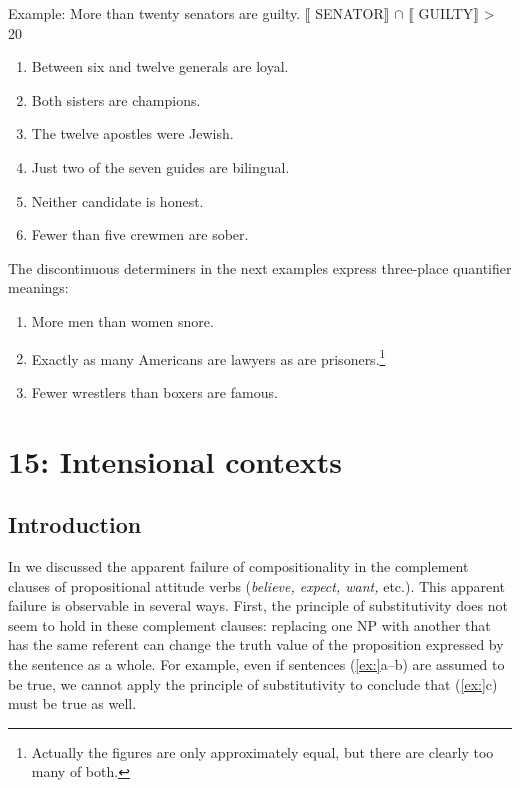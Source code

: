 \begin{stylepoints}
\textsf{Example:} \textsf{More than twenty}\textsf{ senators are guilty.   {\textbar}} $\llbracket$ \textsf{SENATOR}$\rrbracket$ \textsf{ ${\cap}$} $\llbracket$ \textsf{GUILTY}$\rrbracket$ \textsf{ {\textbar} > 20}
\end{stylepoints}

\begin{enumerate}
\item Between six and twelve generals are loyal.
\item Both sisters are champions.
\item The twelve apostles were Jewish.
\item Just two of the seven guides are bilingual.
\item Neither candidate is honest.
\item Fewer than five crewmen are sober.
\end{enumerate}

The discontinuous determiners in the next examples express three-place quantifier meanings:

\begin{enumerate}
\item More men than women snore.
\item Exactly as many Americans are lawyers as are prisoners.\footnote{Actually the figures are only approximately equal, but there are clearly too many of both.}
\item Fewer wrestlers than boxers are famous.
\end{enumerate}

\chapter{{15}: Intensional contexts}

\section{Introduction}\label{sec:} %

In  we discussed the apparent failure of compositionality in the complement clauses of propositional attitude verbs (\textit{believe, expect, want,} etc.). This apparent failure is observable in several ways. First, the principle of substitutivity does not seem to hold in these complement clauses: replacing one NP with another that has the same referent can change the truth value of the proposition expressed by the sentence as a whole. For example, even if sentences (\ref{ex:}a--b) are assumed to be true, we cannot apply the principle of substitutivity to conclude that (\ref{ex:}c) must be true as well.


